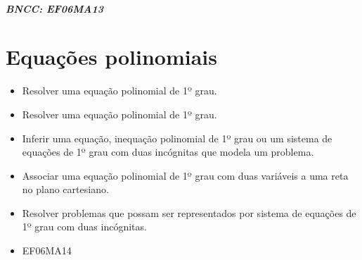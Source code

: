 {\paragraph{BNCC: EF06MA13 }


\chapter{Equações polinomiais}

\begin{itemize}
\item Resolver uma equação polinomial de 1º grau.
\item
 Resolver uma equação polinomial de 1º grau.
\item
  Inferir uma equação, inequação polinomial de 1º grau ou um sistema de
  equações de 1º grau com duas incógnitas que modela um problema.
\item
  Associar uma equação polinomial de 1º grau com duas variáveis a uma
  reta no plano cartesiano.
\item
  Resolver problemas que possam ser representados por sistema de
  equações de 1º grau com duas incógnitas.
\end{itemize}

\begin{itemize} 
\item  EF06MA14
\end{itemize}

}
